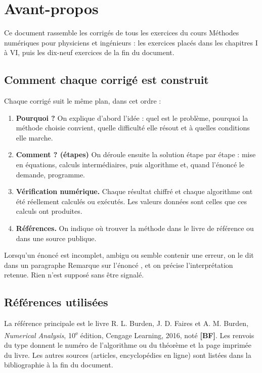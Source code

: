 \chapter*{Avant-propos}

Ce document rassemble les corrigés de tous les exercices du cours
\og Méthodes numériques pour physiciens et ingénieurs \fg{} : les exercices
placés dans les chapitres I à VI, puis les dix-neuf exercices de la fin du
document.

\section{Comment chaque corrigé est construit}

Chaque corrigé suit le même plan, dans cet ordre :
\begin{enumerate}[label=\arabic*.]
  \item \textbf{Pourquoi ?} On explique d'abord l'idée : quel est le
        problème, pourquoi la méthode choisie convient, quelle difficulté
        elle résout et à quelles conditions elle marche.
  \item \textbf{Comment ? (étapes)} On déroule ensuite la solution étape par
        étape : mise en équations, calculs intermédiaires, puis algorithme et,
        quand l'énoncé le demande, programme.
  \item \textbf{Vérification numérique.} Chaque résultat chiffré et chaque
        algorithme ont été réellement calculés ou exécutés. Les valeurs
        données sont celles que ces calculs ont produites.
  \item \textbf{Références.} On indique où trouver la méthode dans le livre de
        référence ou dans une source publique.
\end{enumerate}
Lorsqu'un énoncé est incomplet, ambigu ou semble contenir une erreur, on le
dit dans un paragraphe \og Remarque sur l'énoncé \fg{}, et on précise
l'interprétation retenue. Rien n'est supposé sans être signalé.

\section{Références utilisées}

La référence principale est le livre
R. L. Burden, J. D. Faires et A. M. Burden, \textit{Numerical Analysis},
10\textsuperscript{e} édition, Cengage Learning, 2016, noté \textbf{[BF]}.
Les renvois du type  donnent le numéro de l'algorithme ou
du théorème et la page imprimée du livre. Les autres sources (articles,
encyclopédies en ligne) sont listées dans la bibliographie à la fin du
document.

